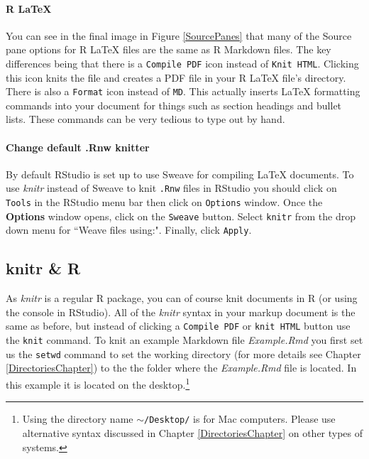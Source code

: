 {{\paragraph{R LaTeX}

You can see in the final image in Figure \ref{SourcePanes} that many of the Source pane options for R LaTeX files are the same as R Markdown files. The key differences being that there is a \texttt{Compile PDF} icon instead of \texttt{Knit HTML}. Clicking this icon knits the file and creates a PDF file in your R LaTeX file's directory. There is also a \texttt{Format} icon instead of \texttt{MD}. This actually inserts LaTeX formatting commands into your document for things such as section headings and bullet lists. These commands can be very tedious to type out by hand.


\paragraph{Change default .Rnw knitter}

By default RStudio is set up to use Sweave for compiling LaTeX documents. To use {\emph{knitr}} instead of Sweave to knit \texttt{.Rnw} files in RStudio you should click on \texttt{Tools} in the RStudio menu bar then click on \texttt{Options} window. Once the {\bf{Options}} window opens, click on the \texttt{Sweave} button. Select \texttt{knitr} from the drop down menu for ``Weave files using:". Finally, click \texttt{Apply}. 

\subsection{knitr \& R}

As {\emph{knitr}} is a regular R package, you can of course knit documents in R (or using the console in RStudio). All of the {\emph{knitr}} syntax in your markup document is the same as before, but instead of clicking a {\tt{Compile PDF}} or {\tt{knit HTML}} button use the {\tt{knit}} command. To knit an example Markdown file {\emph{Example.Rmd}} you first set us the \texttt{setwd} command to set the working directory (for more details see Chapter \ref{DirectoriesChapter}) to the the folder where the {\emph{Example.Rmd}} file is located. In this example it is located on the desktop.\footnote{Using the directory name {\tt{$\sim$/Desktop/}} is for Mac computers. Please use alternative syntax discussed in Chapter \ref{DirectoriesChapter} on other types of systems.}

}}
